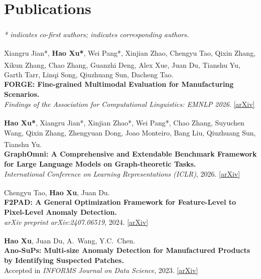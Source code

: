\documentclass[11pt, a4paper]{article}
\begin{document}
\section{Publications}
\small\textit{* indicates co-first authors; \textsuperscript{\textdagger} indicates corresponding authors.}
\vspace{2pt}

\begin{enumerate}[label={[\arabic*]}, leftmargin=2em, itemsep=4pt]

\item Xiangru Jian*, \textbf{Hao Xu*\textsuperscript{\textdagger}}, Wei Pang*, Xinjian Zhao, Chengyu Tao, Qixin Zhang,
  Xikun Zhang\textsuperscript{\textdagger}, Chao Zhang, Guanzhi Deng, Alex Xue, Juan Du, Tianshu Yu, Garth Tarr,
  Linqi Song, Qiuzhuang Sun, Dacheng Tao.\\
  \textbf{FORGE: Fine-grained Multimodal Evaluation for Manufacturing Scenarios.}\\
  \textit{Findings of the Association for Computational Linguistics: EMNLP 2026}.
  \href{https://arxiv.org/abs/2604.07413}{\small[arXiv]}

\item \textbf{Hao Xu*}, Xiangru Jian*\textsuperscript{\textdagger}, Xinjian Zhao*, Wei Pang*, Chao Zhang, Suyuchen Wang,
  Qixin Zhang, Zhengyuan Dong, Joao Monteiro, Bang Liu, Qiuzhuang Sun, Tianshu Yu\textsuperscript{\textdagger}.\\
  \textbf{GraphOmni: A Comprehensive and Extendable Benchmark Framework for Large
  Language Models on Graph-theoretic Tasks.}\\
  \textit{International Conference on Learning Representations (ICLR)}, 2026.
  \href{https://arxiv.org/abs/2504.12764}{\small[arXiv]}

\item Chengyu Tao, \textbf{Hao Xu}, Juan Du\textsuperscript{\textdagger}.\\
  \textbf{F2PAD: A General Optimization Framework for Feature-Level to Pixel-Level
  Anomaly Detection.}\\
  \textit{arXiv preprint arXiv:2407.06519}, 2024.
  \href{https://arxiv.org/abs/2407.06519}{\small[arXiv]}

\item \textbf{Hao Xu}, Juan Du\textsuperscript{\textdagger}, A.\ Wang, Y.C.\ Chen.\\
  \textbf{Ano-SuPs: Multi-size Anomaly Detection for Manufactured Products by
  Identifying Suspected Patches.}\\
  Accepted in \textit{INFORMS Journal on Data Science}, 2023.
  \href{https://arxiv.org/abs/2309.11120}{\small[arXiv]}

\end{enumerate}
\end{document}
